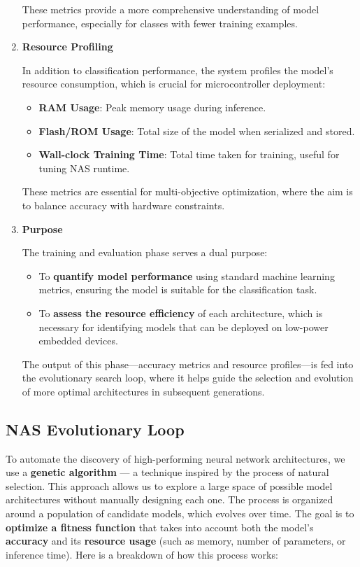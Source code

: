 \begin{enumerate}
\begin{itemize}
\end{itemize}

These metrics provide a more comprehensive understanding of model performance, especially for classes with fewer training examples.

\item \textbf{Resource Profiling}

In addition to classification performance, the system profiles the model’s resource consumption, which is crucial for microcontroller deployment:
\begin{itemize}
    \item \textbf{RAM Usage}: Peak memory usage during inference.
    \item \textbf{Flash/ROM Usage}: Total size of the model when serialized and stored.
    \item \textbf{Wall-clock Training Time}: Total time taken for training, useful for tuning NAS runtime.
\end{itemize}

These metrics are essential for multi-objective optimization, where the aim is to balance accuracy with hardware constraints.
\item \textbf{Purpose}

The training and evaluation phase serves a dual purpose:
\begin{itemize}
    \item To \textbf{quantify model performance} using standard machine learning metrics, ensuring the model is suitable for the classification task.
    \item To\textbf{ assess the resource efficiency }of each architecture, which is necessary for identifying models that can be deployed on low-power embedded devices.
\end{itemize}

The output of this phase—accuracy metrics and resource profiles—is fed into the evolutionary search loop, where it helps guide the selection and evolution of more optimal architectures in subsequent generations.


    
\end{enumerate}




\subsection*{NAS Evolutionary Loop}

To automate the discovery of high-performing neural network architectures, we use a \textbf{genetic algorithm} — a technique inspired by the process of natural selection. This approach allows us to explore a large space of possible model architectures without manually designing each one.
The process is organized around a population of candidate models, which evolves over time. The goal is to \textbf{optimize a fitness function} that takes into account both the model’s \textbf{accuracy} and its \textbf{resource usage} (such as memory, number of parameters, or inference time).
Here is a breakdown of how this process works:

